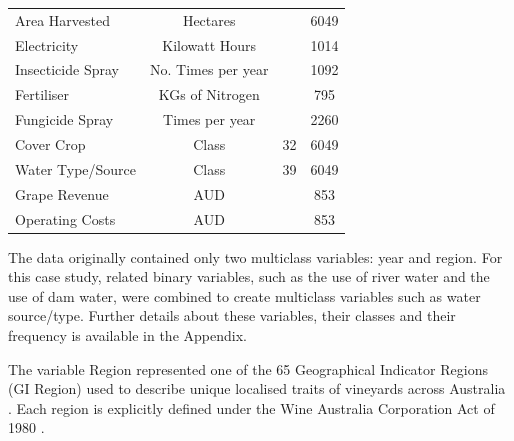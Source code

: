 \documentclass[review,12pt,authoryear]{elsarticle}
\begin{document}
\begin{linenumbers}
\begin{table}[]
\begin{tabular}{@{}lccc@{}}
  Area Harvested & Hectares &  & 6049 \\
  Electricity & Kilowatt Hours &  & 1014 \\
  Insecticide Spray & No. Times per year &  & 1092 \\
  Fertiliser & KGs of Nitrogen &  & 795 \\
  Fungicide Spray & Times per year &  & 2260 \\
  Cover Crop & Class & 32 & 6049 \\
  Water Type/Source & Class & 39 & 6049 \\
  Grape Revenue & AUD &  & 853 \\
  Operating Costs & AUD &  & 853 \\ \bottomrule
  \end{tabular}
  \end{table}
\normalsize
The data originally contained only two multiclass variables: year and region. For this case study, related binary variables, such as the use of river water and the use of dam water, were combined to create multiclass variables such as water source/type. Further details about these variables, their classes and their frequency is available in the Appendix.
\par
The variable Region represented one of the 65 Geographical Indicator Regions (GI Region) used to describe unique localised traits of vineyards across Australia \citep{hallidayAustralianWineEncyclopedia2009,oliverReviewSoilPhysical2013,soarClimateDriversRed2008}. Each region is explicitly defined under the Wine Australia Corporation Act of 1980 \citep{attorney-generalsdepartmentWineAustraliaCorporation2010}.
\par


\end{linenumbers}
\end{document}
